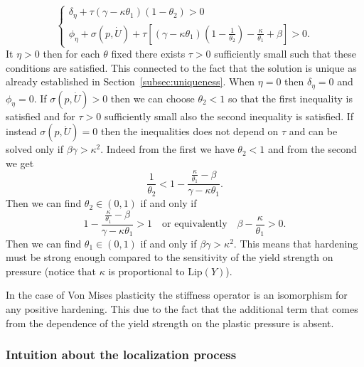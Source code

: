\[
\begin{cases}
\delta_\eta+\tau(\gamma-\kappa\theta_1)(1-\theta_2)>0 \\
\phi_\eta+\sigma(p,\dot U)+\tau\left[(\gamma-\kappa\theta_1)\left(1-\frac{1}{\theta_2}\right)-\frac{\kappa}{\theta_1}+\beta\right]>0.
\end{cases}
\]
It $\eta>0$ then for each $\theta$ fixed there exists $\tau>0$ sufficiently small such that these conditions are satisfied. This connected to the fact that the solution is unique as already established in Section~\ref{subsec:uniqueness}. When $\eta=0$ then $\delta_\eta=0$ and $\phi_\eta=0$. If $\sigma(p,\dot U)>0$ then we can choose $\theta_2<1$ so that the first inequality is satisfied and for $\tau>0$ sufficiently small also the second inequality is satisfied. If instead $\sigma(p,\dot U)=0$ then the inequalities does not depend on $\tau$ and can be solved only if $\beta\gamma>\kappa^2$. Indeed from the first we have $\theta_2<1$ and from the second we get
\[
\frac{1}{\theta_2}<1-\frac{\frac{\kappa}{\theta_1}-\beta}{\gamma-\kappa\theta_1}.
\]
Then we can find $\theta_2\in(0,1)$ if and only if
\[
1-\frac{\frac{\kappa}{\theta_1}-\beta}{\gamma-\kappa\theta_1}>1\quad\text{or equivalently}\quad\beta-\frac{\kappa}{\theta_1}>0.
\]
Then we can find $\theta_1\in(0,1)$ if and only if $\beta\gamma>\kappa^2$. This means that hardening must be strong enough compared to the sensitivity of the yield strength on pressure (notice that $\kappa$ is proportional to $\text{Lip}(Y)$).
\begin{rmk}
In the case of Von Mises plasticity the stiffness operator is an isomorphism for any positive hardening. This due to the fact that the additional term that comes from the dependence of the yield strength on the plastic pressure is absent.
\end{rmk}

\subsubsection*{Intuition about the localization process}

